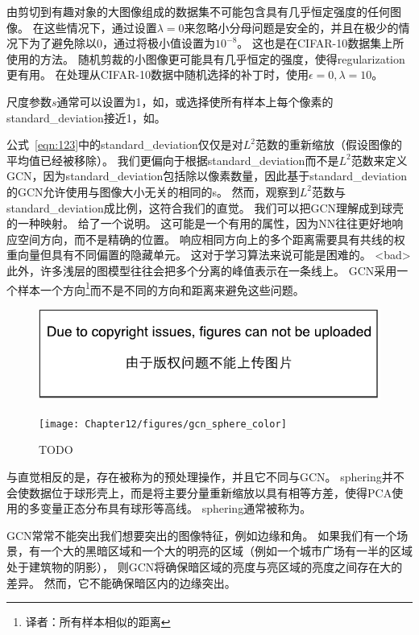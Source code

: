 由剪切到有趣对象的大图像组成的数据集不可能包含具有几乎恒定强度的任何图像。
在这些情况下，通过设置$\lambda = 0$来忽略小分母问题是安全的，并且在极少的情况下为了避免除以0，通过将极小值设置为$10^{-8}$。
这也是\citet{Goodfellow+al-arxiv-2013}在CIFAR-10数据集上所使用的方法。
随机剪裁的小图像更可能具有几乎恒定的强度，使得\gls{regularization}更有用。
在处理从CIFAR-10数据中随机选择的补丁时，\citet{Coates2011}使用$\epsilon = 0, \lambda = 10$。

尺度参数$s$通常可以设置为1，如\citet{Coates2011}，或选择使所有样本上每个像素的\gls{standard_deviation}接近1，如\citet{Goodfellow+al-arxiv-2013}。

公式~\eqref{eqn:123}中的\gls{standard_deviation}仅仅是对$L^2$范数的重新缩放（假设图像的平均值已经被移除）。
我们更偏向于根据\gls{standard_deviation}而不是$L^2$范数来定义\gls{GCN}，因为\gls{standard_deviation}包括除以像素数量，因此基于\gls{standard_deviation}的\gls{GCN}允许使用与图像大小无关的相同的s。
然而，观察到$L^2$范数与\gls{standard_deviation}成比例，这符合我们的直觉。
我们可以把\gls{GCN}理解成到球壳的一种映射。
给了一个说明。
这可能是一个有用的属性，因为\gls{NN}往往更好地响应空间方向，而不是精确的位置。
响应相同方向上的多个距离需要具有共线的权重向量但具有不同偏置的隐藏单元。
这对于学习算法来说可能是困难的。
<bad>此外，许多浅层的图模型往往会把多个分离的峰值表示在一条线上。
\gls{GCN}采用一个样本一个方向\footnote{译者：所有样本相似的距离}而不是不同的方向和距离来避免这些问题。

\begin{figure}[!htb]
\ifOpenSource
\centerline{\includegraphics{figure.pdf}}
\else
	\centerline{\texttt{[image: Chapter12/figures/gcn\_sphere\_color]}}
\fi
	\caption{TODO}
	\label{fig:gcn_sphere_color}
\end{figure}


与直觉相反的是，存在被称为的预处理操作，并且它不同与\gls{GCN}。
\gls{sphering}并不会使数据位于球形壳上，而是将主要分量重新缩放以具有相等方差，使得\gls{PCA}使用的多变量正态分布具有球形等高线。 
\gls{sphering}通常被称为。


\gls{GCN}常常不能突出我们想要突出的图像特征，例如边缘和角。
如果我们有一个场景，有一个大的黑暗区域和一个大的明亮的区域（例如一个城市广场有一半的区域处于建筑物的阴影），
则\gls{GCN}将确保暗区域的亮度与亮区域的亮度之间存在大的差异。
然而，它不能确保暗区内的边缘突出。

